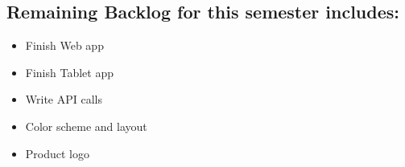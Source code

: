 \documentclass{article}
\begin{document}
\subsection*{Remaining Backlog for this semester includes:}
\begin{itemize}
   \item Finish Web app
   \item Finish Tablet app
   \item Write API calls
   \item Color scheme and layout
   \item Product logo
\end{itemize}
\end{document}
